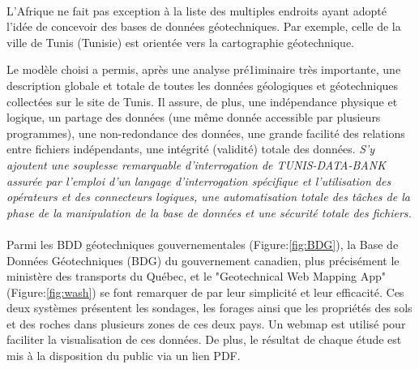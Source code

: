 
\paragraph{}
L'Afrique ne fait pas exception à la liste des multiples endroits ayant adopté l'idée
de concevoir des bases de données géotechniques.
Par exemple, celle de la ville de Tunis (Tunisie) est orientée vers la cartographie géotechnique.
\par
Le modèle choisi a permis, après une analyse
pré1iminaire très importante, une description globale et
totale de toutes les données géologiques et géotechniques collectées sur le site de Tunis. Il
assure, de plus, une indépendance physique et logique, un partage des données (une même donnée accessible  
par plusieurs programmes), une non-redondance des données, une grande facilité des relations
entre fichiers indépendants, une intégrité (validité)
totale des données. 
\textit{S'y ajoutent une souplesse remarquable d'interrogation de TUNIS-DATA-BANK
assurée par l'emploi d'un langage d'interrogation spécifique et l'utilisation des opérateurs et des connecteurs
logiques, une automatisation totale des tâches de la
phase de la manipulation de la base de données et une
sécurité totale des fichiers.}
\cite{mongereau1988conception}

\paragraph{} 
Parmi les BDD géotechniques gouvernementales (Figure:\ref{fig:BDG}), la Base de Données Géotechniques
(BDG) du gouvernement canadien, plus précisément le
ministère des transports du Québec, et le "Geotechnical Web Mapping App" (Figure:\ref{fig:wash}) se font remarquer
de par leur simplicité et leur efficacité. Ces deux systèmes présentent les sondages, les forages ainsi que les 
propriétés des sols et des roches dans plusieurs zones de ces deux pays.
Un webmap est utilisé pour faciliter la visualisation de ces données.
De plus, le résultat de chaque étude est mis à la disposition du public
via un lien PDF.

